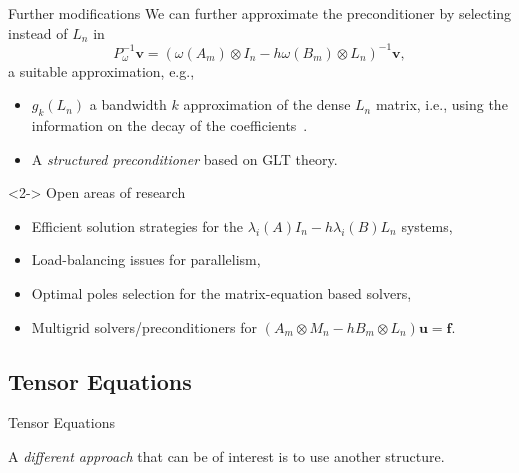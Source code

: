 \documentclass[aspectratio=169,xcolor=dvipsnames]{beamer}
\begin{document}
\begin{frame}{Further modifications}
We can further approximate the preconditioner by selecting instead of $L_n$ in
\[
P_\omega^{-1} \mathbf{v} = (\omega(A_m)\otimes I_n - h \omega(B_m)\otimes L_n)^{-1}\mathbf{v},
\]
a suitable approximation, e.g.,
\begin{itemize}
	\item[\faCog] $g_k(L_n)$ a bandwidth $k$ approximation of the dense $L_n$ matrix, i.e., using the information on the decay of the coefficients~\parencite{MR3860196}.
	\item[\faCog] A \emph{structured preconditioner} based on GLT theory.
\end{itemize}

\begin{exampleblock}<2->{\faBinoculars\; Open areas of research}
\begin{itemize}
	\item[\faWalking] Efficient solution strategies for the $\lambda_i(A) I_n - h \lambda_i(B) L_n$ systems,
	\item[\faWalking] Load-balancing issues for parallelism, 
	\item[\faWalking] Optimal poles selection for the matrix-equation based solvers,
	\item[\faWalking] Multigrid solvers/preconditioners for $({A_m} \otimes M_n - h {B_m} \otimes L_n) \mathbf{u} = {\mathbf{f}}$.
\end{itemize}
\end{exampleblock}

\end{frame}

\subsection{Tensor Equations}

\begin{frame}{\faCompress\;Tensor Equations}

\faHammer\;A \emph{different approach} that can be of interest is to use \alert{another structure}.\vfill



\end{frame}
\end{document}
